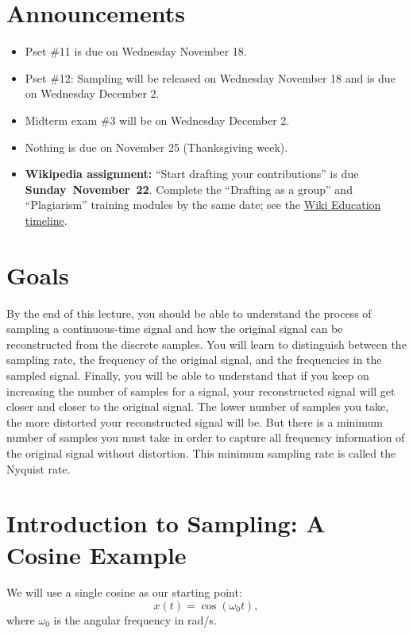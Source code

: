 \section{Announcements}
\begin{itemize}
    \item Pset \#11 is due on Wednesday November 18.
    \item Pset \#12: Sampling will be released on Wednesday November 18 and is due on Wednesday December 2.
    \item Midterm exam \#3 will be on Wednesday December 2.
    \item Nothing is due on November 25 (Thanksgiving week).
    \item \textbf{Wikipedia assignment:} ``Start drafting your contributions'' is due
    \textbf{\mbox{Sunday November 22}}. Complete the ``Drafting as a group'' and
    ``Plagiarism'' training modules by the same date; see the
    \href{https://dashboard.wikiedu.org/courses/UC_Merced/Signal_Processing_and_Linear_Systems_(Fall_2026)/timeline}{Wiki Education timeline}.
\end{itemize}

\section{Goals}
By the end of this lecture, you should be able to understand the process of sampling a continuous-time signal and how the original signal can be reconstructed from the discrete samples. You will learn to distinguish between the sampling rate, the frequency of the original signal, and the frequencies in the sampled signal. Finally, you will be able to understand that if you keep on increasing the number of samples for a signal, your reconstructed signal will get closer and closer to the original signal. The lower number of samples you take, the more distorted your reconstructed signal will be. But there is a minimum number of samples you must take in order to capture all frequency information of the original signal without distortion. This minimum sampling rate is called the Nyquist rate.
\section{Introduction to Sampling: A Cosine Example}
We will use a single cosine as our starting point:
\[
x(t) = \cos(\omega_0 t),
\]
where $\omega_0$ is the angular frequency in rad/s.

